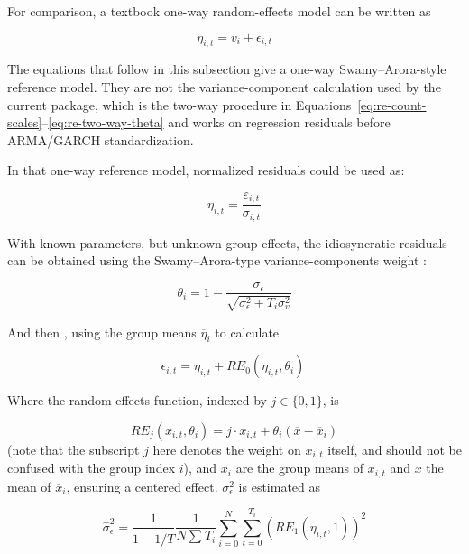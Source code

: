 \documentclass[12pt]{article}
\begin{document}
For comparison, a textbook one-way random-effects model can be written as

\begin{equation}
\eta_{i,t} = v_{i} + \epsilon_{i,t}
\label{eq:50}
\end{equation}

The equations that follow in this subsection give a one-way Swamy--Arora-style reference model. They are not the variance-component calculation used by the current package, which is the two-way procedure in Equations~\ref{eq:re-count-scales}--\ref{eq:re-two-way-theta} and works on regression residuals before ARMA/GARCH standardization.

In that one-way reference model, normalized residuals could be used as:

\begin{equation}
\eta_{i,t} = \frac{\varepsilon_{i,t}}{\sigma_{i,t}}
\label{eq:51}
\end{equation}

With known parameters, but unknown group effects, the idiosyncratic
residuals can be obtained using the Swamy--Arora-type variance-components weight \citep{swamy1972exact}:

\begin{equation}
\theta_{i} = 1 - \frac{\sigma_{\epsilon}}{\sqrt{\sigma_{\epsilon}^{2} + T_{i}\sigma_{v}^{2}}}
\label{eq:re1}
\end{equation}

And then \citep[pp.~412--413]{greene2012econometric}, using the
group means ${\overline{\eta}}_{i}$ to calculate

\begin{equation}
\epsilon_{i,t} = \eta_{i,t} + RE_{0}(\eta_{i,t},\theta_{i})\
\label{eq:re2}
\end{equation}

Where the random effects function, indexed by $j \in \{0,1\}$, is

\begin{equation}
RE_{j}\left( x_{i,t},\theta_{i} \right) = j \cdot x_{i,t} + \theta_{i}\left( \overline{x} - {\overline{x}}_{i} \right)
\label{eq:re3}
\end{equation}
(note that the subscript $j$ here denotes the weight on $x_{i,t}$ itself, and should not be confused with the group index $i$),
and ${\overline{x}}_{i}$ are the group means of $x_{i,t}$ and
$\overline{x}$ the mean of ${\overline{x}}_{i}$, ensuring a centered
effect. $\sigma_{\epsilon}^{2}$ is estimated as

\begin{equation}{\widehat{\sigma}}_{\epsilon}^{2} = \frac{1}{1 - \overline{1/T}}\frac{1}{N\sum_{}^{}T_{i}}\sum_{i = 0}^{N}{\sum_{t = 0}^{T_{i}}\left( RE_{1}\left( \eta_{i,t},1 \right) \right)^{2}}
\label{eq:re4}
\end{equation}
\end{document}
